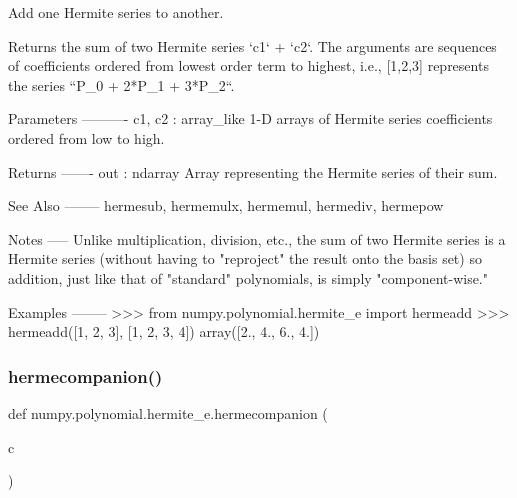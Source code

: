 \begin{DoxyVerb}Add one Hermite series to another.

Returns the sum of two Hermite series `c1` + `c2`.  The arguments
are sequences of coefficients ordered from lowest order term to
highest, i.e., [1,2,3] represents the series ``P_0 + 2*P_1 + 3*P_2``.

Parameters
----------
c1, c2 : array_like
    1-D arrays of Hermite series coefficients ordered from low to
    high.

Returns
-------
out : ndarray
    Array representing the Hermite series of their sum.

See Also
--------
hermesub, hermemulx, hermemul, hermediv, hermepow

Notes
-----
Unlike multiplication, division, etc., the sum of two Hermite series
is a Hermite series (without having to "reproject" the result onto
the basis set) so addition, just like that of "standard" polynomials,
is simply "component-wise."

Examples
--------
>>> from numpy.polynomial.hermite_e import hermeadd
>>> hermeadd([1, 2, 3], [1, 2, 3, 4])
array([2.,  4.,  6.,  4.])\end{DoxyVerb}
 \mbox{\label{namespacenumpy_1_1polynomial_1_1hermite__e_a1cd306ca9c16a0f21e7c06b365316b34}} 
\subsubsection{\texorpdfstring{hermecompanion()}{hermecompanion()}}
{\footnotesize\ttfamily def numpy.\+polynomial.\+hermite\+\_\+e.\+hermecompanion (\begin{DoxyParamCaption}\item[{}]{c }\end{DoxyParamCaption})}

